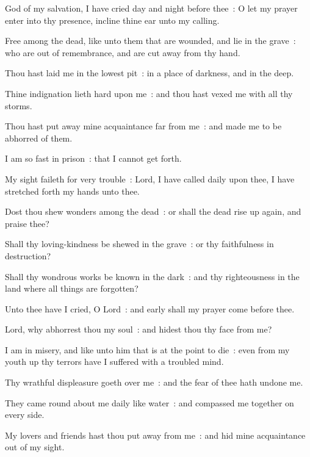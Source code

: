  God of my salvation, I have cried day and night before thee~: O let my prayer enter into thy presence, incline thine ear unto my calling.\par
{}
Free among the dead, like unto them that are wounded, and lie in the grave~: who are out of remembrance, and are cut away from thy hand.\par
{}Thou hast laid me in the lowest pit~: in a place of darkness, and in the deep.\par
{}Thine indignation lieth hard upon me~: and thou hast vexed me with all thy storms.\par
{}Thou hast put away mine acquaintance far from me~: and made me to be abhorred of them.\par
{}I am so fast in prison~: that I cannot get forth.\par
{}My sight faileth for very trouble~: Lord, I have called daily upon thee, I have stretched forth my hands unto thee.\par
{}Dost thou shew wonders among the dead~: or shall the dead rise up again, and praise thee?\par
{}Shall thy loving-kindness be shewed in the grave~: or thy faithfulness in destruction?\par
{}Shall thy wondrous works be known in the dark~: and thy righteousness in the land where all things are forgotten?\par
{}Unto thee have I cried, O Lord~: and early shall my prayer come before thee.\par
{}Lord, why abhorrest thou my soul~: and hidest thou thy face from me?\par
{}I am in misery, and like unto him that is at the point to die~: even from my youth up thy terrors have I suffered with a troubled mind.\par
{}Thy wrathful displeasure goeth over me~: and the fear of thee hath undone me.\par
{}They came round about me daily like water~: and compassed me together on every side.\par
{}My lovers and friends hast thou put away from me~: and hid mine acquaintance out of my sight.\par

